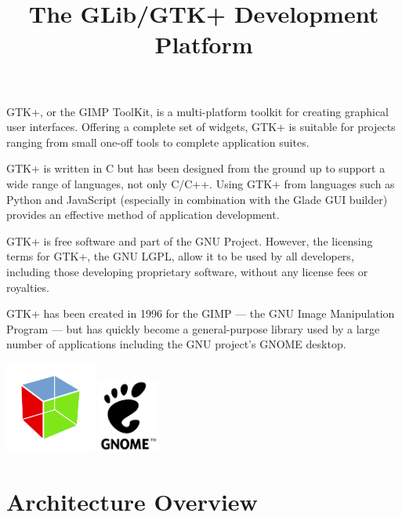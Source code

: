 \documentclass[a4paper,notumble]{leaflet}
\title{The GLib/GTK+ Development Platform}
\date{}
\author{}
\begin{document}
\maketitle
\thispagestyle{empty}

GTK+, or the GIMP ToolKit, is a multi-platform toolkit for creating graphical user interfaces. Offering a complete set of widgets, GTK+ is suitable for projects ranging from small one-off tools to complete application suites.

GTK+ is written in C but has been designed from the ground up to support a wide range of languages, not only C/C++. Using GTK+ from languages such as Python and JavaScript (especially in combination with the Glade GUI builder) provides an effective method of application development.

GTK+ is free software and part of the GNU Project. However, the licensing terms for GTK+, the GNU LGPL, allow it to be used by all developers, including those developing proprietary software, without any license fees or royalties.

GTK+ has been created in 1996 for the GIMP --- the GNU Image Manipulation Program --- but has quickly become a general-purpose library used by a large number of applications including the GNU project's GNOME desktop.

\begin{center}
  \includegraphics[width=3cm]{images/gtk-logo.pdf}
  \hspace{1cm}
  \includegraphics[width=2cm]{images/gnome-logo.pdf}
\end{center}

\pagebreak

\section{Architecture Overview}
\end{document}

